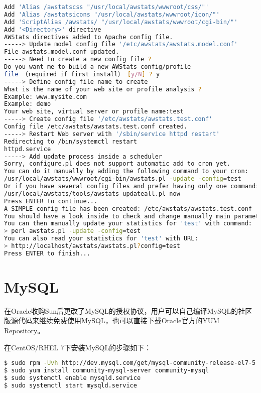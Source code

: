 \begin{lstlisting}[language=bash]
Add 'Alias /awstatscss "/usr/local/awstats/wwwroot/css/"'
Add 'Alias /awstatsicons "/usr/local/awstats/wwwroot/icon/"'
Add 'ScriptAlias /awstats/ "/usr/local/awstats/wwwroot/cgi-bin/"'
Add '<Directory>' directive
AWStats directives added to Apache config file.
-----> Update model config file '/etc/awstats/awstats.model.conf'
File awstats.model.conf updated.
-----> Need to create a new config file ?
Do you want me to build a new AWStats config/profile
file （required if first install） [y/N] ? y
-----> Define config file name to create
What is the name of your web site or profile analysis ?
Example: www.mysite.com
Example: demo
Your web site, virtual server or profile name:test
-----> Create config file '/etc/awstats/awstats.test.conf'
Config file /etc/awstats/awstats.test.conf created.
-----> Restart Web server with '/sbin/service httpd restart'
Redirecting to /bin/systemctl restart
httpd.service
-----> Add update process inside a scheduler
Sorry, configure.pl does not support automatic add to cron yet.
You can do it manually by adding the following command to your cron:
/usr/local/awstats/wwwroot/cgi-bin/awstats.pl -update -config=test
Or if you have several config files and prefer having only one command:
/usr/local/awstats/tools/awstats_updateall.pl now
Press ENTER to continue...
A SIMPLE config file has been created: /etc/awstats/awstats.test.conf
You should have a look inside to check and change manually main parameters.
You can then manually update your statistics for 'test' with command:
> perl awstats.pl -update -config=test
You can also read your statistics for 'test' with URL:
> http://localhost/awstats/awstats.pl?config=test
Press ENTER to finish...
\end{lstlisting}



\section{MySQL}

在Oracle收购Sun后更改了MySQL的授权协议，用户可以自己编译MySQL的社区版源代码来继续免费使用MySQL，也可以直接下载Oracle官方的YUM Repository。


在CentOS/RHEL 7下安装MySQL的步骤如下：

\begin{lstlisting}[language=bash]
$ sudo rpm -Uvh http://dev.mysql.com/get/mysql-community-release-el7-5.noarch.rpm
$ sudo yum install community-mysql-server community-mysql
$ sudo systemctl enable mysqld.service
$ sudo systemctl start mysqld.service
\end{lstlisting}





